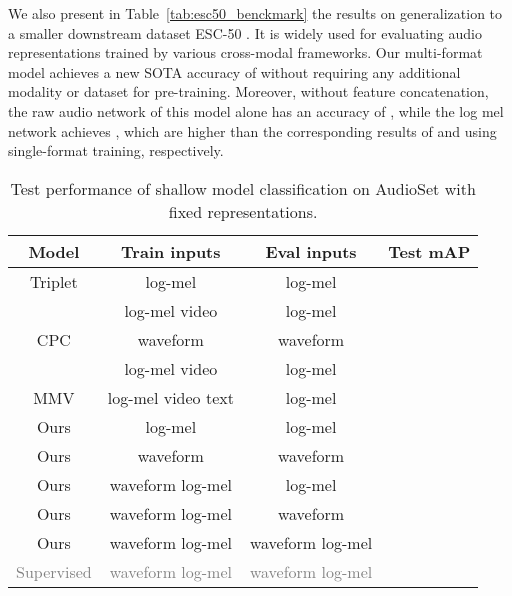 \documentclass{article}
\newcommand\spv[1]{\textcolor{grey}{#1}}
\begin{document}
We also present in Table~\ref{tab:esc50_benckmark} the results on generalization to a smaller downstream dataset ESC-50 \cite{piczak2015esc}. It is widely used for evaluating audio representations trained by various cross-modal frameworks. Our multi-format model achieves a new SOTA accuracy of  without requiring any additional modality or dataset for pre-training. Moreover, without feature concatenation, the raw audio network of this model alone has an accuracy of , while the log mel network achieves , which are higher than the corresponding results of  and  using single-format training, respectively.


\begin{table}[t]
  \caption{Test performance of shallow model classification on AudioSet with fixed representations.}
  \label{tab:benckmark}
  \centering
  \begin{tabular}{ c c c c }
    \toprule
    \textbf{Model} & \textbf{Train inputs} & \textbf{Eval inputs} & \textbf{Test mAP} \\
    \midrule
    Triplet \cite{jansen2018unsupervised} & log-mel  & log-mel        & ~~~\\
     \cite{arandjelovic2017look} & log-mel  video & log-mel & ~~~\\
    CPC \cite{wang2020contrastive}                  & waveform   & waveform       & ~~~\\
 \cite{jansen2019coincidence} & log-mel  video & log-mel  & ~~~\\
    MMV \cite{alayrac2020self} & log-mel  video  text & log-mel & ~~~\\
    \midrule
    Ours                  & log-mel   & log-mel       & ~~~\\
    Ours                  & waveform  & waveform        & ~~~\\
    Ours                  & waveform  log-mel  & log-mel        & ~~~\\
    Ours                  & waveform  log-mel  & waveform        & ~~~\\
    Ours                  & waveform  log-mel  & waveform  log-mel        & ~~~\\
    \midrule
    \spv{Supervised \cite{kong2020panns}} & \spv{waveform  log-mel} &  \spv{waveform  log-mel}  & \spv{}~~~\\
    \bottomrule
  \end{tabular}
  
\end{table}
\end{document}
